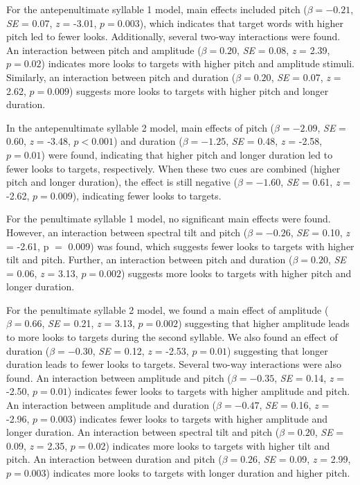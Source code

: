 For the antepenultimate syllable 1 model, main effects included pitch ($\beta= -0.21$, \textit{SE} = 0.07, \textit{z} = -3.01, $p = 0.003$), which indicates that target words with higher pitch led to fewer looks. Additionally, several two-way interactions were found. An interaction between pitch and amplitude ($\beta= 0.20$, \textit{SE} = 0.08, \textit{z} = 2.39, $p = 0.02$) indicates more looks to targets with higher pitch and amplitude stimuli. Similarly, an interaction between pitch and duration ($\beta= 0.20$, \textit{SE} = 0.07, \textit{z} = 2.62, $p = 0.009$) suggests more looks to targets with higher pitch and longer duration. 

In the antepenultimate syllable 2 model, main effects of pitch ($\beta= -2.09$, \textit{SE} = 0.60, \textit{z} = -3.48, $p < 0.001$) and duration ($\beta= -1.25$, \textit{SE} = 0.48, \textit{z} = -2.58, $p = 0.01$) were found, indicating that higher pitch and longer duration led to fewer looks to targets, respectively. When these two cues are combined (higher pitch and longer duration), the effect is still negative ($\beta= -1.60$, \textit{SE} = 0.61, \textit{z} = -2.62, $p = 0.009$), indicating fewer looks to targets.

For the penultimate syllable 1 model, no significant main effects were found. However, an interaction between spectral tilt and pitch ($\beta= -0.26$, \textit{SE} = 0.10, \textit{z} = -2.61, p $=$ 0.009) was found, which suggests fewer looks to targets with higher tilt and pitch. Further, an interaction between pitch and duration ($\beta= 0.20$, \textit{SE} = 0.06, \textit{z} = 3.13, $p = 0.002$) suggests more looks to targets with higher pitch and longer duration.

For the penultimate syllable 2 model, we found a main effect of amplitude ($\beta= 0.66$, \textit{SE} = 0.21, \textit{z} = 3.13, $p = 0.002$) suggesting that higher amplitude leads to more looks to targets during the second syllable. We also found an effect of duration ($\beta= -0.30$, \textit{SE} = 0.12, \textit{z} = -2.53, $p = 0.01$) suggesting that longer duration leads to fewer looks to targets. Several two-way interactions were also found. An interaction between amplitude and pitch ($\beta= -0.35$, \textit{SE} = 0.14, \textit{z} = -2.50, $p = 0.01$) indicates fewer looks to targets with higher amplitude and pitch. An interaction between amplitude and duration ($\beta= -0.47$, \textit{SE} = 0.16, \textit{z} = -2.96, $p = 0.003$) indicates fewer looks to targets with higher amplitude and longer duration. An interaction between spectral tilt and pitch ($\beta= 0.20$, \textit{SE} = 0.09, \textit{z} = 2.35, $p = 0.02$) indicates more looks to targets with higher tilt and pitch. An interaction between duration and pitch ($\beta= 0.26$, \textit{SE} = 0.09, \textit{z} = 2.99, $p = 0.003$) indicates more looks to targets with longer duration and higher pitch. 



